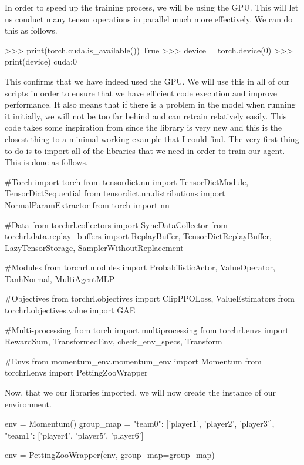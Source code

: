 \vs
In order to speed up the training process, we will be using the GPU. This will let us conduct many tensor operations in parallel much more effectively. We can do this as follows.

\begin{mpy}
>>> print(torch.cuda.is_available())
True
>>> device = torch.device(0)
>>> print(device)
cuda:0
\end{mpy}

\vs
This confirms that we have indeed used the GPU. We will use this in all of our scripts in order to ensure that we have efficient code execution and improve performance. It also means that if there is a problem in the model when running it initially, we will not be too far behind and can retrain relatively easily.
\vs
This code takes some inspiration from \cite{multi_ppo} since the library is very new and this is the closest thing to a minimal working example that I could find. The very first thing to do is to import all of the libraries that we need in order to train our agent. This is done as follows.

\begin{mpy}
#Torch
import torch
from tensordict.nn import TensorDictModule, TensorDictSequential
from tensordict.nn.distributions import NormalParamExtractor
from torch import nn

#Data
from torchrl.collectors import SyncDataCollector
from torchrl.data.replay_buffers import ReplayBuffer, TensorDictReplayBuffer, LazyTensorStorage, SamplerWithoutReplacement

#Modules
from torchrl.modules import ProbabilisticActor, ValueOperator, TanhNormal, MultiAgentMLP

#Objectives
from torchrl.objectives import ClipPPOLoss, ValueEstimators
from torchrl.objectives.value import GAE

#Multi-processing
from torch import multiprocessing
from torchrl.envs import RewardSum, TransformedEnv, check_env_specs, Transform

#Envs
from momentum_env.momentum_env import Momentum
from torchrl.envs import PettingZooWrapper
\end{mpy}

Now, that we our libraries imported, we will now create the instance of our environment.

\begin{mpy}
env = Momentum()
group_map = {"team0": ['player1', 'player2', 'player3'],
            "team1": ['player4', 'player5', 'player6']}

env = PettingZooWrapper(env, group_map=group_map)
\end{mpy}

